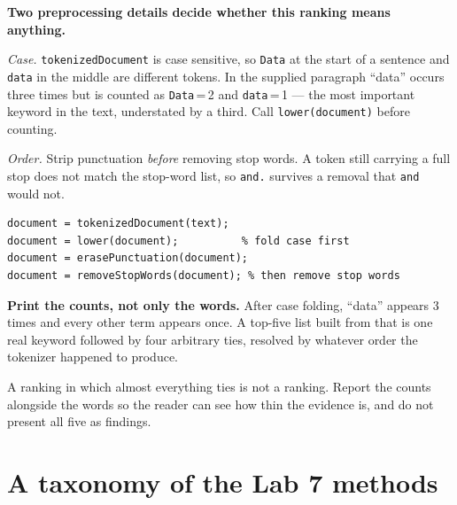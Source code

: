 \begin{pitfall}
\textbf{Two preprocessing details decide whether this ranking means anything.}

\emph{Case.} \texttt{tokenizedDocument} is case sensitive, so \texttt{Data} at the start of a sentence and \texttt{data} in the middle are different tokens. In the supplied paragraph ``data'' occurs three times but is counted as \texttt{Data}\,=\,2 and \texttt{data}\,=\,1 --- the most important keyword in the text, understated by a third. Call \texttt{lower(document)} before counting.

\emph{Order.} Strip punctuation \emph{before} removing stop words. A token still carrying a full stop does not match the stop-word list, so \texttt{and.} survives a removal that \texttt{and} would not.

\begin{lstlisting}[style=mlmatlab]
document = tokenizedDocument(text);
document = lower(document);          % fold case first
document = erasePunctuation(document);
document = removeStopWords(document); % then remove stop words
\end{lstlisting}
\end{pitfall}

\begin{pitfall}
\textbf{Print the counts, not only the words.} After case folding, ``data'' appears 3 times and every other term appears once. A top-five list built from that is one real keyword followed by four arbitrary ties, resolved by whatever order the tokenizer happened to produce.

A ranking in which almost everything ties is not a ranking. Report the counts alongside the words so the reader can see how thin the evidence is, and do not present all five as findings.
\end{pitfall}

\section{A taxonomy of the Lab 7 methods}

\begin{mlfigure}
\end{mlfigure}

